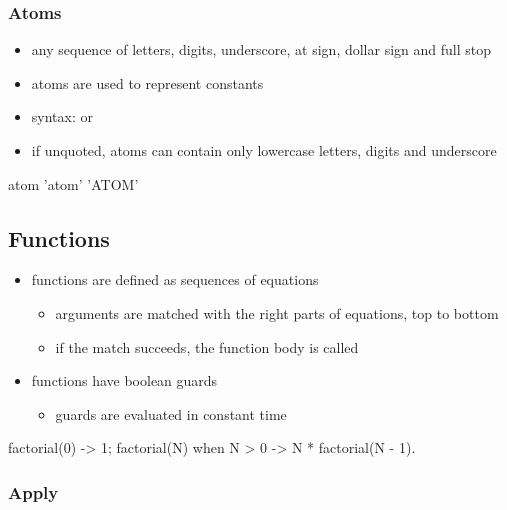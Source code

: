 \documentclass[a4paper,landscape,10pt]{article}
\begin{document}
\begin{multicols*}{2}
  \subsubsection{Atoms}
  \label{sec:erlang-atoms}

  \begin{itemize}
    \item any sequence of letters, digits, underscore, at sign, dollar sign and full stop
    \item atoms are used to represent constants
    \item syntax:  or 
    \item if unquoted, atoms can contain only lowercase letters, digits and underscore
  \end{itemize}

  \begin{erlang}
atom   %
'atom' %
'ATOM' %
\end{erlang}

  \columnbreak

  \subsection{Functions}

  \begin{itemize}
    \item functions are defined as sequences of equations
          \begin{itemize}
            \item arguments are matched with the right parts of equations, top to bottom
            \item if the match succeeds, the function body is called
          \end{itemize}
    \item functions have boolean guards 
          \begin{itemize}
            \item guards are evaluated in constant time
          \end{itemize}
  \end{itemize}

  \begin{erlang}
factorial(0) -> 1;
factorial(N) when N > 0 -> N * factorial(N - 1).
\end{erlang}

  \subsubsection{Apply}


\end{multicols*}
\end{document}
